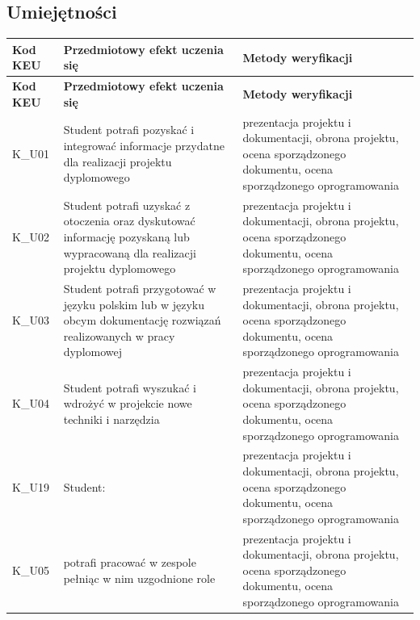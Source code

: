 \documentclass[12pt, a4paper]{article}
\newcommand{\thdrule}{\noalign{\global\setlength{\extrarowheight}{0pt}}}
\newcommand{\thdend}{\noalign{\global\setlength{\extrarowheight}{3pt}}}
\begin{document}
\subsection*{Umiejętności}
{\scriptsize
\begin{longtable}{m{1.6cm}m{9.0cm}m{4.2cm}}
\thdrule\toprule
\rowcolor{pjatkRed} {\color{white}\footnotesize\textbf{\vphantom{Ag}Kod KEU}} & {\color{white}\footnotesize\textbf{\vphantom{Ag}Przedmiotowy efekt uczenia się}} & {\color{white}\footnotesize\textbf{\vphantom{Ag}Metody weryfikacji}} \\
\midrule\thdend
\endfirsthead
\thdrule\toprule
\rowcolor{pjatkRed} {\color{white}\footnotesize\textbf{\vphantom{Ag}Kod KEU}} & {\color{white}\footnotesize\textbf{\vphantom{Ag}Przedmiotowy efekt uczenia się}} & {\color{white}\footnotesize\textbf{\vphantom{Ag}Metody weryfikacji}} \\
\midrule\thdend
\endhead
  \rowcolor{tableRowLight} K\_U01 & Student potrafi pozyskać i integrować informacje przydatne dla realizacji projektu dyplomowego & prezentacja projektu i dokumentacji, obrona projektu, ocena sporządzonego dokumentu, ocena sporządzonego oprogramowania \\
  \rowcolor{tableRowAlt} K\_U02 & Student potrafi uzyskać z otoczenia oraz dyskutować informację pozyskaną lub wypracowaną dla realizacji projektu dyplomowego & prezentacja projektu i dokumentacji, obrona projektu, ocena sporządzonego dokumentu, ocena sporządzonego oprogramowania \\
  \rowcolor{tableRowLight} K\_U03 & Student potrafi przygotować w języku polskim lub w języku obcym dokumentację rozwiązań realizowanych w pracy dyplomowej & prezentacja projektu i dokumentacji, obrona projektu, ocena sporządzonego dokumentu, ocena sporządzonego oprogramowania \\
  \rowcolor{tableRowAlt} K\_U04 & Student potrafi wyszukać i wdrożyć w projekcie nowe techniki i narzędzia & prezentacja projektu i dokumentacji, obrona projektu, ocena sporządzonego dokumentu, ocena sporządzonego oprogramowania \\
  \rowcolor{tableRowLight} K\_U19 & Student: & prezentacja projektu i dokumentacji, obrona projektu, ocena sporządzonego dokumentu, ocena sporządzonego oprogramowania \\
  \rowcolor{tableRowAlt} K\_U05 & potrafi pracować w zespole pełniąc w nim uzgodnione role & prezentacja projektu i dokumentacji, obrona projektu, ocena sporządzonego dokumentu, ocena sporządzonego oprogramowania \\

\end{longtable}}
\end{document}
